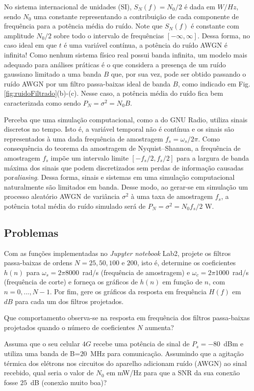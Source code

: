 \documentclass[12pt,addpoints]{exam}
\begin{document}
No sistema internacional de unidades (SI), $S_N(f)=N_0/2$ é dada em $W/Hz$, sendo $N_0$ uma constante representando a contribuição de cada componente de frequência para a potência média do ruído. Note que $S_N(f)$ é constante com amplitude $N_0/2$ sobre todo o intervalo de frequências $[-\infty,\infty]$. Dessa forma, no caso ideal em que $t$ é uma variável contínua, a potência do ruído AWGN é infinita! Como nenhum sistema físico real possui banda infinita, um modelo mais adequado para análises práticas é o que considera a presença de um ruído gaussiano limitado a uma banda $B$ que,  por sua vez, pode ser obtido passando o ruído AWGN  por um filtro passa-baixas ideal de banda $B$, como indicado em Fig.\ref{fig:ruidoFiltrado}(b)-(c). Nesse caso, a potência média do ruído fica bem caracterizada como sendo $P_N = \sigma^2 = N_0B$.

Perceba que uma simulação computacional, como a do GNU Radio, utiliza sinais discretos no tempo. Isto é, a variável temporal não é contínua e os sinais são representados à uma dada frequência de amostragem $f_s=\omega_s/2\pi$. Como consequência do teorema da amostragem de Nyquist–Shannon, a frequência de amostragem $f_s$ impõe um intervalo limite $[-f_s/2,f_s/2]$ para a largura de banda máxima dos sinais que podem discretizados sem perdas de informação causadas por\textit{aliasing}. Dessa forma, sinais e sistemas em uma simulação computacional naturalmente são limitados em banda. Desse modo, ao gerar-se em simulação um processo aleatório AWGN de variância $\sigma^2$ à uma taxa de amostragem $f_s$, a potência total média do ruído simulado será de $P_N = \sigma^2=N_0f_s/2$ W.

\subsection{Problemas}

\begin{questions}

\question Com as funções implementadas no \textit{Jupyter notebook} Lab2, projete os filtros passa-baixas de ordens $N = 25,50,100\text{ e }200$, isto é, determine os coeficientes $h(n)$ para $\omega_s = 2\pi 8000$~rad/s (frequência de amostragem) e $\omega_c = 2\pi 1000$~rad/s (frequência de corte) e forneça os gráficos de $h(n)$ em função de $n$, com $n=0,...,N-1$. Por fim, gere os gráficos da resposta em frequência $H(f)$ em $dB$ para cada um dos filtros projetados. 

\question Que comportamento observa-se na resposta em frequência dos filtros passa-baixas projetados quando o número de coeficientes $N$ aumenta?

\question Assuma que o seu celular $4G$ recebe uma potência de sinal de $P_s=-80$~dBm e utiliza uma banda de B=$20$~MHz para comunicação. Assumindo que a agitação térmica dos elétrons nos circuitos do aparelho adicionam ruído (AWGN) ao sinal recebido, qual seria o valor de $N_0$ em mW/Hz para que a $\mathrm{SNR}$ da sua conexão fosse $25$~dB (conexão muito boa)?

\end{questions}
\end{document}
